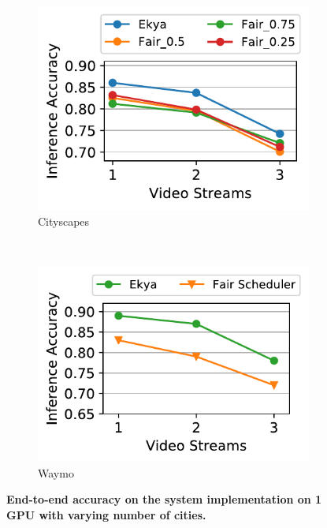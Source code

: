\begin{figure}
  \centering
  \begin{subfigure}[t]{0.5\linewidth}
    \centering
    \includegraphics[width=\linewidth]{results/sys_impl/multicam_acc_vs_res_sysimpl_cityscapes.pdf} 
    \caption{Cityscapes}
    \label{fig:sysimpl-result-cityscapes}
  \end{subfigure}
  ~~~
  \begin{subfigure}[t]{0.5\linewidth}
    \centering
    \includegraphics[width=\linewidth]{results/sys_impl/sysimpl_varyingcities_waymo.pdf} 
    \caption{Waymo}
    \label{fig:sysimpl-result-waymo}
  \end{subfigure}
  \caption{\bf End-to-end accuracy on the system implementation on 1 GPU with varying number of cities.}
  \label{fig:sysimpl-result}
\end{figure}